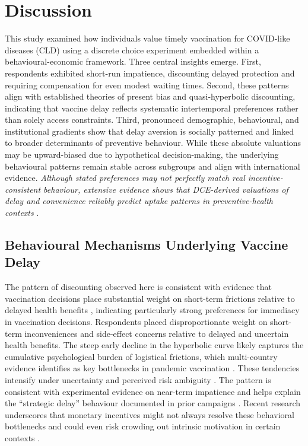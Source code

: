 \documentclass[preprint,12pt]{elsarticle}
\begin{document}
\clearpage

\section{Discussion}\label{sec:discussion}
\doublespacing

This study examined how individuals value timely vaccination for COVID-like diseases (CLD) 
using a discrete choice experiment embedded within a behavioural-economic framework. 
Three central insights emerge. First, respondents exhibited short-run impatience, discounting delayed protection and requiring compensation for even modest waiting times. Second, these patterns align with established theories of present bias and 
quasi-hyperbolic discounting, indicating that vaccine delay reflects systematic intertemporal 
preferences rather than solely access constraints. Third, pronounced demographic, behavioural, 
and institutional gradients show that delay aversion is socially patterned and linked to broader 
determinants of preventive behaviour. While these absolute valuations may be upward-biased 
due to hypothetical decision-making, the underlying behavioural patterns remain stable across 
subgroups and align with international evidence. \textit{Although stated preferences may not perfectly match real incentive-consistent 
behaviour, extensive evidence shows that DCE-derived valuations of delay and convenience 
reliably predict uptake patterns in preventive-health contexts} \cite{Johnson2013,Hensher2015,Kong2025}.


\subsection{Behavioural Mechanisms Underlying Vaccine Delay}

The pattern of discounting observed here is consistent with evidence that vaccination decisions place substantial weight on short-term frictions relative to delayed health benefits \cite{vanderPol2001,Attema2013,Attema2018}, indicating particularly strong preferences for immediacy in vaccination decisions. Respondents placed disproportionate weight on short-term inconveniences and side-effect concerns relative to delayed and uncertain health benefits. The steep early decline in the hyperbolic curve likely captures the cumulative psychological burden of logistical frictions, which multi-country evidence identifies as key bottlenecks in pandemic vaccination \cite{Kong2025}. These tendencies intensify under uncertainty and perceived risk ambiguity \cite{Brewer2017}. The pattern is consistent with experimental evidence on near-term impatience \cite{Laibson1997,ODonoghue1999} and helps explain the ``strategic delay'' behaviour documented in prior campaigns \cite{Lievre2024,Tran2025}. Recent research underscores that monetary incentives might not always resolve these behavioral bottlenecks and could even risk crowding out intrinsic motivation in certain contexts \cite{Yamamura2026}.
\end{document}
